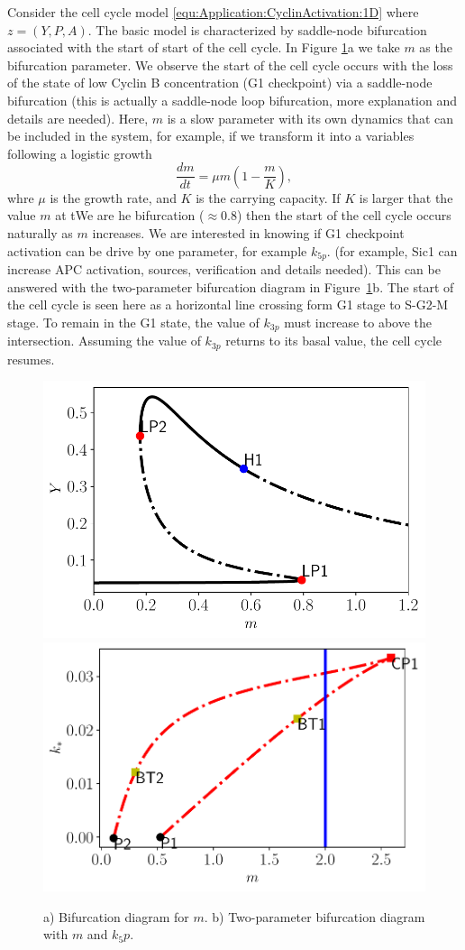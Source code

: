 \documentclass[12pt]{article}
\begin{document}
Consider the cell cycle model \eqref{equ:Application:CyclinActivation:1D} where $z=(Y, P, A)$. The basic model is characterized by saddle-node bifurcation associated with the start of start of the cell cycle. In Figure \ref{fig:Application:CyclinActivation}a we take $m$ as the bifurcation parameter. We observe the start of the cell cycle occurs with the loss of the state of low Cyclin B concentration (G1 checkpoint) via a saddle-node bifurcation (this is actually a saddle-node loop bifurcation, more explanation and details are needed). Here, $m$ is a slow parameter with its own dynamics that can be included in the system, for example, if we transform it into a variables following a logistic growth
\begin{equation}
    \frac{dm}{dt} = \mu m \left(1 - \frac{m}{K}\right),
    \label{equ:Application:CyclinActivation:Mass}
\end{equation}
whre $\mu$ is the growth rate, and $K$ is the carrying capacity. If $K$ is larger that the value $m$ at tWe are he bifurcation ($\approx 0.8$) then the start of the cell cycle occurs naturally as $m$ increases. We are interested in knowing if G1 checkpoint activation can be drive by one parameter, for example $k_{5p}$. (for example, Sic1 can increase APC activation, sources, verification and details needed). This can be answered with the two-parameter bifurcation diagram in Figure~\ref{fig:Application:CyclinActivation}b. The start of the cell cycle is seen here as a horizontal line crossing form G1 stage to S-G2-M stage. To remain in the G1 state, the value of $k_{3p}$ must increase to above the intersection. Assuming the value of $k_{3p}$ returns to its basal value, the cell cycle resumes.

\begin{figure}
    \begin{center}
    \includegraphics[width=0.48\linewidth]{figures/ApplicationCellCycleBifurcation.pdf}
    \includegraphics[width=0.48\linewidth]{Manuscript/figures/ApplicationCellCycleTwoParBifurcation.pdf}
    \end{center}
    \caption{a) Bifurcation diagram for $m$. b) Two-parameter bifurcation diagram with $m$ and $k_5p$.}
    \label{fig:Application:CyclinActivation}
\end{figure}
\end{document}
